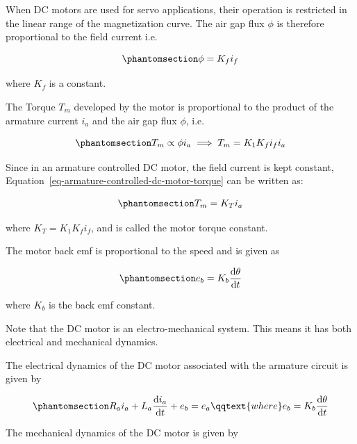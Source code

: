\documentclass[
  14pt,
  a4paper,
  oneside,
  open=any,
  a4paper,
  14pt]{report}
\begin{document}
When DC motors are used for servo applications, their operation is
restricted in the linear range of the magnetization curve. The air gap
flux \(\phi\) is therefore proportional to the field current i.e.~

\begin{equation}\phantomsection\label{eq-armature-controlled-dc-motor-flux}{
    \phi = K_f i_f
}\end{equation}

where \(K_f\) is a constant.

The Torque \(T_m\) developed by the motor is proportional to the product
of the armature current \(i_a\) and the air gap flux \(\phi\), i.e.

\begin{equation}\phantomsection\label{eq-armature-controlled-dc-motor-torque}{
    T_m \propto \phi i_a \implies T_m = K_1 K_f i_f i_a
}\end{equation}

Since in an armature controlled DC motor, the field current is kept
constant, Equation~\ref{eq-armature-controlled-dc-motor-torque} can be
written as:

\begin{equation}\phantomsection\label{eq-armature-controlled-dc-motor-torque-constant}{
    T_m = K_T i_a
}\end{equation}

where \(K_T = K_1 K_f i_f\), and is called the motor torque constant.

The motor back emf is proportional to the speed and is given as

\begin{equation}\phantomsection\label{eq-armature-controlled-dc-motor-back-emf}{
    e_b = K_b \odv{\theta}{t}
}\end{equation}

where \(K_b\) is the back emf constant.

Note that the DC motor is an electro-mechanical system. This means it
has both electrical and mechanical dynamics.

The electrical dynamics of the DC motor associated with the armature
circuit is given by

\begin{equation}\phantomsection\label{eq-armature-controlled-dc-motor-electrical-dynamics}{
    R_a i_a + L_a \odv{i_a}{t} + e_b = e_a \qqtext{where} e_b = K_b \odv{\theta}{t}
}\end{equation}

The mechanical dynamics of the DC motor is given by
\end{document}
